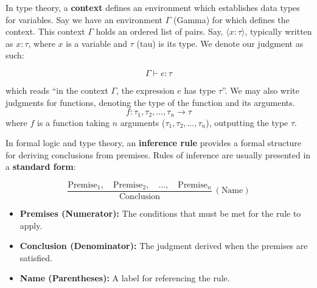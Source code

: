\begin{Def}

    In type theory, a \textbf{context} defines an environment which establishes data types for variables.
    Say we have an environment $\Gamma$ (Gamma) for which defines the context. This context $\Gamma$ holds 
    an ordered list of pairs. Say, $\langle x : \tau \rangle$, typically written as $x : \tau$,
    where $x$ is a variable and $\tau$ (tau) is its type. We denote our judgment as such:
    \LARGE

    \vspace{-1em}
    \[\Gamma \vdash e: \tau\]

    \normalsize 
    \noindent
    which reads ``in the context $\Gamma$, the expression $e$ has type $\tau$''. 
    We may also write judgments for functions, denoting the type of the function and its arguments.
    \LARGE
    \[ f : \tau_1, \tau_2, \ldots, \tau_n \rightarrow \tau \]
    \normalsize
    \noindent 
    where $f$ is a function taking $n$ arguments ($\tau_1, \tau_2, \ldots, \tau_n$), outputting the type $\tau$.
    
    \hfill \cite{WikipediaTypingEnvironment}
\end{Def}

\newpage 

\begin{Def}

    In formal logic and type theory, an \textbf{inference rule} provides a formal structure for deriving conclusions from premises. 
    Rules of inference are usually presented in a \textbf{standard form}: \Large

    \[
    \frac{\text{Premise}_1, \quad \text{Premise}_2, \quad \ldots, \quad \text{Premise}_n}{\text{Conclusion}} \ (\text{Name})
    \]

    \normalsize
    \begin{itemize}
        \item \textbf{Premises (Numerator):} The conditions that must be met for the rule to apply.
        \item \textbf{Conclusion (Denominator):} The judgment derived when the premises are satisfied.
        \item \textbf{Name (Parentheses):} A label for referencing the rule. \hfill \cite{wiki:rule_of_inference}
    \end{itemize}
\end{Def}

